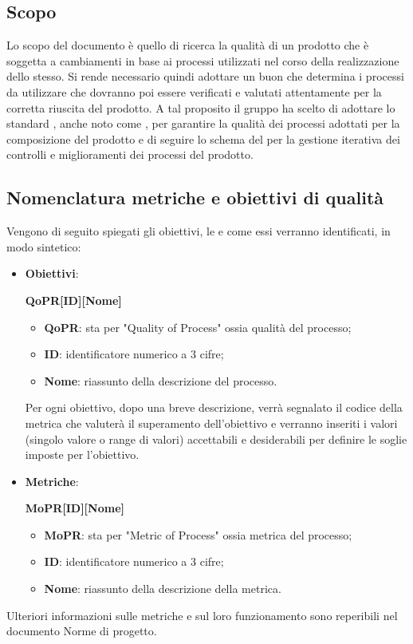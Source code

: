 \documentclass[../piano-di-qualifica.tex]{subfiles}
\begin{document}
\subsection{Scopo}%
\label{sub:scopo}
Lo scopo del documento è quello di ricerca la qualità di un prodotto che è soggetta a cambiamenti in base ai processi utilizzati nel corso della realizzazione dello stesso.
Si rende necessario quindi adottare un buon  che determina i processi da utilizzare che dovranno poi essere verificati e valutati attentamente per la corretta riuscita del prodotto.
A tal proposito il gruppo ha scelto di adottare lo standard , anche noto come , per garantire la qualità dei processi adottati per la composizione del prodotto e di seguire lo schema del  per la gestione iterativa dei controlli e miglioramenti dei processi del prodotto.

\subsection{Nomenclatura metriche e obiettivi di qualità}%
\label{sub:nomenclatura_metriche_e_obiettivi_di_qualita}
Vengono di seguito spiegati gli obiettivi, le  e come essi verranno identificati, in modo sintetico:
\begin{itemize}
    \item \textbf{Obiettivi}: 
    \begin{center}
        \centering
        \textbf{QoPR[ID][Nome]}
    \end{center}
        \begin{itemize}
            \item \textbf{QoPR}: sta per "Quality of Process" ossia qualità del processo;
            \item \textbf{ID}: identificatore numerico a 3 cifre;
            \item \textbf{Nome}: riassunto della descrizione del processo.
        \end{itemize}
        Per ogni obiettivo, dopo una breve descrizione, verrà segnalato il codice della metrica che valuterà il superamento dell'obiettivo e verranno inseriti i valori (singolo valore o range di valori) accettabili e desiderabili per definire le soglie imposte per l'obiettivo.
    \item \textbf{Metriche}: 
    \begin{center}
        \centering
        \textbf{MoPR[ID][Nome]}
    \end{center}
        \begin{itemize}
            \item \textbf{MoPR}: sta per "Metric of Process" ossia metrica del processo;
            \item \textbf{ID}: identificatore numerico a 3 cifre;
            \item \textbf{Nome}: riassunto della descrizione della metrica.
        \end{itemize}
\end{itemize}  
Ulteriori informazioni sulle metriche e sul loro funzionamento sono reperibili nel documento Norme di progetto.
\end{document}
